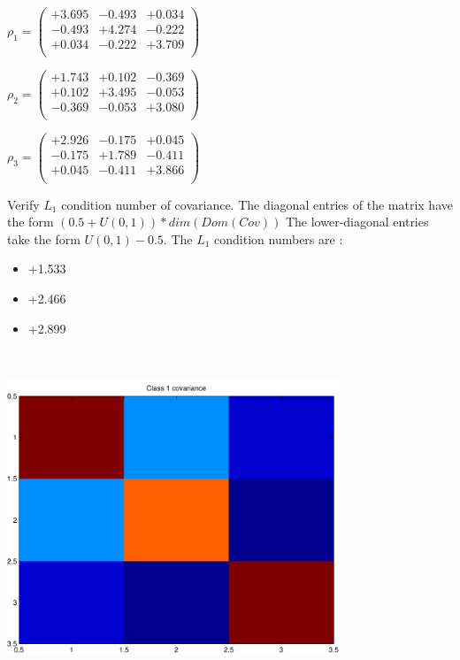 \documentclass[9pt]{article}
\theoremstyle{plain}
\theoremstyle{definition}
\theoremstyle{remark}
\numberwithin{equation}{section}
\begin{document}
$\rho_1 = \left(
\begin{array}{
ccc}
+3.695 & -0.493 & +0.034 \\
-0.493 & +4.274 & -0.222 \\
+0.034 & -0.222 & +3.709 \\
\end{array}
\right)$ \newline 

$\rho_2 = \left(
\begin{array}{
ccc}
+1.743 & +0.102 & -0.369 \\
+0.102 & +3.495 & -0.053 \\
-0.369 & -0.053 & +3.080 \\
\end{array}
\right)$ \newline 

$\rho_3 = \left(
\begin{array}{
ccc}
+2.926 & -0.175 & +0.045 \\
-0.175 & +1.789 & -0.411 \\
+0.045 & -0.411 & +3.866 \\
\end{array}
\right)$ \newline 

Verify $L_1$ condition number of covariance. The diagonal entries of the matrix have the form $(0.5 + U(0,1) )*dim(Dom(Cov))$
The lower-diagonal entries take the form $U(0,1) - 0.5$. 
The $L_1$ condition numbers are :
\begin{itemize}
\item +1.533
\item +2.466
\item +2.899
\end{itemize}
\includegraphics[width=10.0cm,height=10.0cm]{rv1_corr.pdf}
\end{document}
